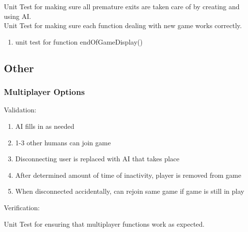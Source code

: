\documentclass[11pt, titlepage]{article}
\begin{document}
			Unit Test for making sure all premature exits are taken care of by creating and using AI.\\
			Unit Test for making sure each function dealing with new game works correctly.
			\begin{enumerate}
				\item unit test for function endOfGameDisplay()			
			\end{enumerate}
		\subsection{Other}	
			\subsubsection{Multiplayer Options}
			Validation:
			\begin{enumerate}
				\item AI fills in as needed
				\item 1-3 other humans can join game
				\item Disconnecting user is replaced with AI that takes place
				\item After determined amount of time of inactivity, player is removed from game
				\item When disconnected accidentally, can rejoin same game if game is still in play
			\end{enumerate}
			Verification:
			
			Unit Test for ensuring that multiplayer functions work as expected.
		
\end{document}
